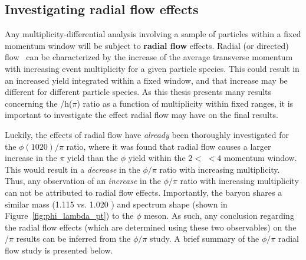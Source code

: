 \clearpage

\subsection{Investigating radial flow effects}
\label{sec:radial_flow}

Any multiplicity-differential analysis involving a sample of particles within a fixed \pt momentum window will be subject to \textbf{radial flow} effects. Radial (or directed) flow~\cite{DirectedFlow2} can be characterized by the increase of the average transverse momentum \meanpt with increasing event multiplicity for a given particle species. This could result in an increased yield integrated within a fixed \pt window, and that increase may be different for different particle species. As this thesis presents many results concerning the \lmb/h($\pi$) ratio as a function of multiplicity within fixed \pt ranges, it is important to investigate the effect radial flow may have on the final results.

Luckily, the effects of radial flow have \textit{already} been thoroughly investigated for the $\phi(1020)$/$\pi$ ratio, where it was found that radial flow causes a larger increase in the $\pi$ yield than the $\phi$ yield within the $2 <$ \pt $< 4$ \GeVc momentum window. This would result in a \textit{decrease} in the $\phi / \pi$ ratio with increasing multiplicity. Thus, any observation of an \textit{increase} in the $\phi/\pi$ ratio with increasing multiplicity can not be attributed to radial flow effects. Importantly, the \lmb baryon shares a similar mass (1.115 vs. 1.020 \GeVmass) and \pt spectrum shape (shown in Figure~\ref{fig:phi_lambda_pt}) to the $\phi$ meson. As such, any conclusion regarding the radial flow effects (which are determined using these two observables) on the \lmb/$\pi$ results can be inferred from the $\phi/\pi$ study. A brief summary of the $\phi/\pi$ radial flow study is presented below.


